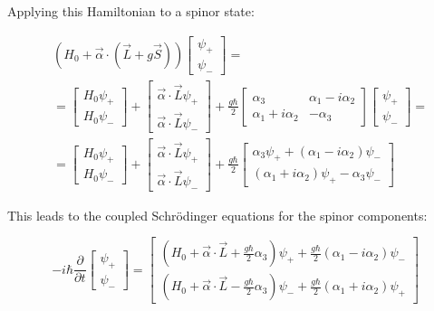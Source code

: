 Applying this Hamiltonian to a spinor state:

\begin{align}
& \left(H_{0}+\vec{\alpha} \cdot(\vec{L}+g \vec{S})\right)\left[\begin{array}{l}
\psi_{+} \\
\psi_{-}
\end{array}\right]= \\
& =\left[\begin{array}{l}
H_{0} \psi_{+} \\
H_{0} \psi_{-}
\end{array}\right]+\left[\begin{array}{l}
\vec{\alpha} \cdot \vec{L} \psi_{+} \\
\vec{\alpha} \cdot \vec{L} \psi_{-}
\end{array}\right]+\frac{g \hbar}{2}\left[\begin{array}{cc}
\alpha_{3} & \alpha_{1}-i \alpha_{2} \\
\alpha_{1}+i \alpha_{2} & -\alpha_{3}
\end{array}\right]\left[\begin{array}{l}
\psi_{+} \\
\psi_{-}
\end{array}\right]=  \\
& =\left[\begin{array}{l}
H_{0} \psi_{+} \\
H_{0} \psi_{-}
\end{array}\right]+\left[\begin{array}{l}
\vec{\alpha} \cdot \vec{L} \psi_{+} \\
\vec{\alpha} \cdot \vec{L} \psi_{-}
\end{array}\right]+\frac{g \hbar}{2}\left[\begin{array}{l}
\alpha_{3} \psi_{+}+\left(\alpha_{1}-i \alpha_{2}\right) \psi_{-} \\
\left(\alpha_{1}+i \alpha_{2}\right) \psi_{+}-\alpha_{3} \psi_{-}
\end{array}\right]
\end{align}

This leads to the coupled Schrödinger equations for the spinor components:

\[
-i \hbar \frac{\partial}{\partial t}\left[\begin{array}{l}
\psi_{+}  \\
\psi_{-}
\end{array}\right]=\left[\begin{array}{l}
\left(H_{0}+\vec{\alpha} \cdot \vec{L}+\frac{g\hbar}{2}\alpha_{3}\right) \psi_{+}+\frac{g\hbar}{2}\left(\alpha_{1}-i \alpha_{2}\right) \psi_{-} \\
\left(H_{0}+\vec{\alpha} \cdot \vec{L}-\frac{g\hbar}{2}\alpha_{3}\right) \psi_{-}+\frac{g\hbar}{2}\left(\alpha_{1}+i \alpha_{2}\right) \psi_{+}
\end{array}\right]
\]


